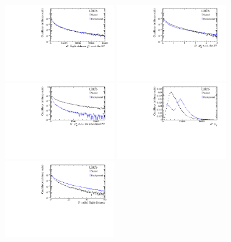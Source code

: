 \begin{figure}[tbp]
	\begin{center}
		\includegraphics[width=0.42\textwidth]{07selection/figs/BDTInputs/ab2_FDCHI2_ORIVX.pdf}
		\includegraphics[width=0.42\textwidth]{07selection/figs/BDTInputs/ab2_IPCHI2_ORIVX.pdf}\\
		\includegraphics[width=0.42\textwidth]{07selection/figs/BDTInputs/ab2_IPCHI2_OWNPV.pdf}
		\includegraphics[width=0.42\textwidth]{07selection/figs/BDTInputs/ab2_PT.pdf}\\
		\includegraphics[width=0.42\textwidth]{07selection/figs/BDTInputs/ab2_RadialFD_squared.pdf}

\end{center}
\end{figure}
